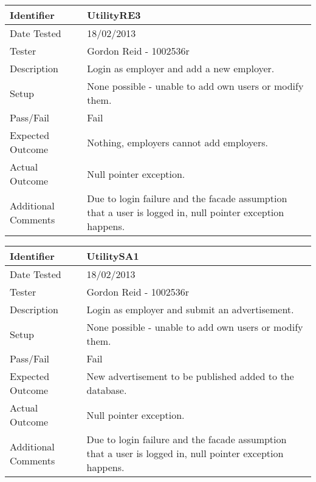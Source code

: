 \vspace{2em}

\begin{tabularx}{\textwidth}{|T|L|}
\hline
Identifier & UtilityRE3\\
\hline
Date Tested & 18/02/2013\\
\hline
Tester & Gordon Reid - 1002536r\\
\hline
Description & Login as employer and add a new employer.\\
\hline
Setup & None possible - unable to add own users or modify them.\\
\hline
Pass/Fail & Fail\\
\hline
Expected Outcome & Nothing, employers cannot add employers.\\
\hline
Actual Outcome & Null pointer exception.\\
\hline
Additional Comments & Due to login failure and the facade assumption that a user 
is logged in, null pointer exception happens.\\
\hline
\end{tabularx}

\vspace{2em}


\begin{tabularx}{\textwidth}{|T|L|}
\hline
Identifier & UtilitySA1\\
\hline
Date Tested & 18/02/2013\\
\hline
Tester & Gordon Reid - 1002536r\\
\hline
Description & Login as employer and submit an advertisement.\\
\hline
Setup & None possible - unable to add own users or modify them.\\
\hline
Pass/Fail & Fail\\
\hline
Expected Outcome & New advertisement to be published added to the database.\\
\hline
Actual Outcome & Null pointer exception.\\
\hline
Additional Comments & Due to login failure and the facade assumption that a user 
is logged in, null pointer exception happens.\\
\hline
\end{tabularx}

\vspace{2em}

